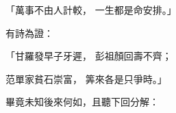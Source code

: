 \begin{showcontents}{}
「萬事不由人計較，  一生都是命安排。」

有詩為證：

「甘羅發早子牙遲，  彭祖顏回壽不齊；

范單家貧石崇富，  筭來各是只爭時。」

畢竟未知後來何如，且聽下回分解：




\end{showcontents}


